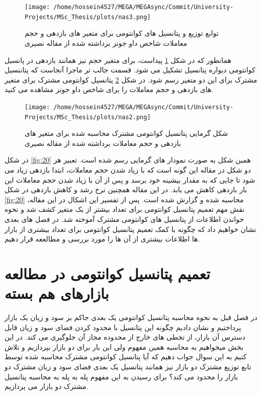 \documentclass[a4paper,titlepage,12pt,fleqn,oneside]{report}
\begin{document}
	\begin{figure}[ptb]
		\centering
		\texttt{[image: /home/hossein4527/MEGA/MEGAsync/Commit/University-Projects/MSc\_Thesis/plots/nas3.png]}
		\caption{توابع توزیع و پتانسیل های کوانتومی برای متغیر های بازدهی و حجم معاملات شاخص داو جونز  
			برداشته شده از مقاله نصیری \cite{nas2}
		}
		\label{fig:18}
	\end{figure}
	همانطور که در شکل
	\ref{fig:18}
	پیداست، برای متغیر حجم نیز همانند بازدهی در پانسیل کوانتومی دیواره پتانسیل تشکیل می شود. 
	قسمت جالب تر ماجرا آنجاست که پتاننسیل مشترک برای این دو متغیر رسم شود. در شکل
	\ref{fig:19}
	پتانسیل کوانتومی مشترک برای متغیر های بازدهی و حجم معاملات را برای شاخص داو جونز مشاهده می کنید.
	\begin{figure}[ptb]
		\centering
		\texttt{[image: /home/hossein4527/MEGA/MEGAsync/Commit/University-Projects/MSc\_Thesis/plots/nas2.png]}
		\caption{شکل گرمایی پتانسیل کوانتومی مشترک محاسبه شده برای متغیر های بازدهی و حجم معاملات  
			برداشته شده از مقاله نصیری \cite{nas2}
		}
		\label{fig:19}
	\end{figure}
	در شکل
	\ref{fig:20}
	همین شکل به صورت نمودار های گرمایی رسم شده است. 
	تعبیر هر دو شکل در مقاله
	\cite{nas2}
	این گونه است که با زیاد شدن حجم معاملات، ابتدا بازدهی زیاد می شود تا جایی که به مقدار بیشینه خود برسد و پس از آن با زیاد شدن حجم معاملات این بار بازدهی کاهش می یابد. 
	در این مقاله همچنین نرخ رشد و کاهش بازدهی در شکل 
	\ref{fig:20}
	محاسبه شده و گزارش شده است. 
	پس از تفسیر این اشکال در این مقاله، نقش مهم تعمیم پتانسیل کوانتومی برای تعداد بیشتر از یک متغیر کشف شد و نحوه خواندن اطلاعات از پتانسیل های کوانتومی مشترک آموخته شد. 
	در فصل های بعدی نشان خواهیم داد که چگونه با کمک تعمیم پتانسیل کوانتومی برای تعداد بیشتری از بازار ها اطلاعات بیشتری از آن ها را مورد بررسی و مطالععه قرار دهیم. 
	\chapter{تعمیم پتانسیل کوانتومی در مطالعه بازارهای هم بسته}
	
	در فصل قبل به نحوه محاسبه پتانسیل کوانتومی یک بعدی جاکم بر سود و زیان یک بازار پرداختیم و نشان دادیم چگونه این پتانسیل با محدود کردن فضای سود و زیان قابل دسترس آن بازار، از تخطی های خارج از محدوده مجاز آن جلوگیری می کند. در این بخش میخواهیم به محاسبه همین مفهوم ولی این بار برای دو بازار بپردازیم و تلاش کنیم به این سوال جواب دهیم که آیا پتانسیل کوانتومی مشترک محاسبه شده توسط تابع توزیع مشترک دو بازار نیز همانند پتانسیل یک بعدی فضای سود و زیان مشترک دو بازار را محدود می کند؟ برای رسیدن به این مفهوم پله به پله به محاسبه پتانسیل مشترک دو بازار می پردازیم.
	
\end{document}
